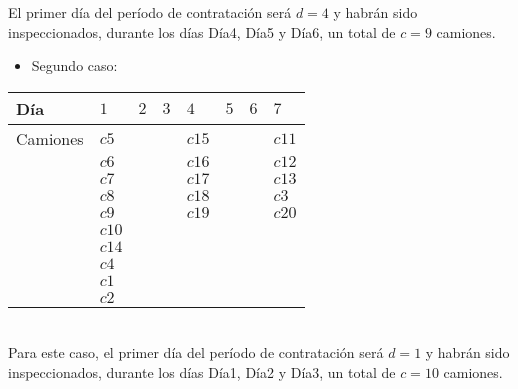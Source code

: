 \documentclass[11pt, a4paper, twoside]{article}
\begin{document}
El primer día del período de contratación será $d=4$ y habrán sido inspeccionados, durante los días Día4, Día5 y Día6, un total de $c=9$ camiones. \\

\begin{itemize}
	\item Segundo caso:
\end{itemize} 

\begin{tabular}{|l|l|l|l|l|l|l|l|}
	\hline
	Día          &  $1$  & $2$   & $3$   & $4$    & $5$ & $6$ & $7$   \\
	\hline
	Camiones     &  $c5$ &       &       & $c15$  &     &     & $c11$ \\
				 &  $c6$ &       &       & $c16$  &     &     & $c12$ \\    
				 &	$c7$ &       &       & $c17$  &     &     & $c13$ \\  
				 &	$c8$ &       &       & $c18$  &     &     & $c3$  \\
				 &	$c9$ &       &       & $c19$  &     &     & $c20$ \\
				 &	$c10$&       &       &        &     &     &       \\
				 &	$c14$&       &       &        &     &     &       \\
				 &	$c4$ &       &       &        &     &     &       \\
				 &	$c1$ &       &       &        &     &     &       \\
				 &	$c2$ &       &       &        &     &     &       \\
	\hline
\end{tabular} \\

Para este caso, el primer día del período de contratación será $d=1$ y habrán sido inspeccionados, durante los días Día1, Día2 y Día3, un total de $c=10$ camiones. 
\end{document}
